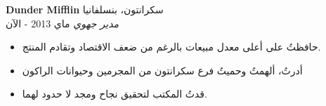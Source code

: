 \foreignlanguage{english}{\textbf{Dunder Mifflin}} \hfill سكرانتون، بنسلفانيا\\
\textit{مدير جهوي} \hfill ماي 2013 - الآن\\
\vspace{-1mm}
\begin{itemize}
	\item حافظتُ على أعلى معدل مبيعات بالرغم من ضعف الاقتصاد وتقادم المنتج.
	\item أدرتُ، ألهمتُ وحميتُ فرع سكرانتون من المجرمين وحيوانات الراكون
	\item قدتُ المكتب لتحقيق نجاح ومجد لا حدود لهما.
\end{itemize}